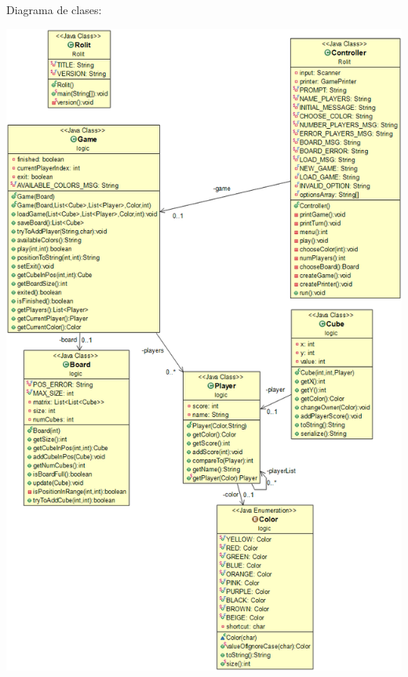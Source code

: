 \documentclass[../DocumentoOficial.tex]{subfiles}
\begin{document}
\begin{sprint}[2]
Diagrama de clases:
\begin{center}
\includegraphics[scale=0.48]{diagramaclasesS2.png}
\end{center}


\end{sprint}
\end{document}
